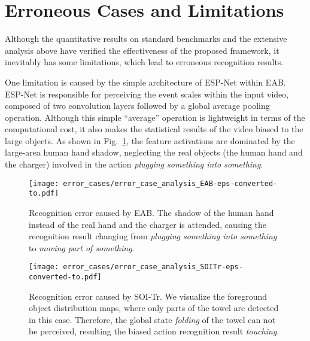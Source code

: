 \section{Erroneous Cases and Limitations}

Although the quantitative results on standard benchmarks and the extensive analysis above have verified the effectiveness of the proposed framework, it inevitably has some limitations, which lead to erroneous recognition results.





One limitation is caused by the simple architecture of ESP-Net within EAB. ESP-Net is responsible for perceiving the event scales within the input video, composed of two convolution layers followed by a global average pooling operation. Although this simple ``average'' operation is lightweight in terms of the computational cost, it also makes the statistical results of the video biased to the large objects.
As shown in Fig.~\ref{fig_error_eab}, the feature activations are dominated by the large-area human hand shadow, neglecting the real objects (the human hand and the charger) involved in the action \textit{plugging something into something}.



\begin{figure}[!thp]
	\centering
	\centerline{\texttt{[image: error\_cases/error\_case\_analysis\_EAB-eps-converted-to.pdf]}}
	\caption {
		Recognition error caused by EAB.
	The shadow of the human hand instead of the real hand and the charger is attended, causing the recognition result changing from \textit{plugging something into something} to \textit{moving part of something}.
	}
	\label{fig_error_eab}
\end{figure}
\begin{figure}[!thp]
	\centering
	\centerline{\texttt{[image: error\_cases/error\_case\_analysis\_SOITr-eps-converted-to.pdf]}}
	\caption{
		Recognition error caused by SOI-Tr.
		We visualize the foreground object distribution maps, where only parts of the {towel} are detected in this case.
		Therefore, the global state \textit{folding} of the {towel} can not be perceived, resulting the biased action recognition result \textit{touching}.
	}
	\label{fig_error_soitr}
\end{figure}

